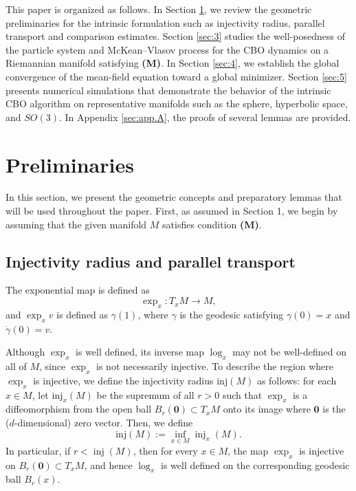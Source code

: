 \documentclass[11pt]{amsart}
\begin{document}
 
 

This paper is organized as follows. In Section \ref{sec:2}, we review the geometric preliminaries for the intrinsic formulation such as injectivity radius, parallel transport and comparison estimates. Section \ref{sec:3} studies the well-posedness of the particle system and McKean--Vlasov process for the CBO dynamics on a Riemannian manifold satisfying \textbf{(M)}. In Section \ref{sec:4}, we establish the global convergence of the mean-field equation toward a global minimizer. Section \ref{sec:5} presents numerical simulations that demonstrate the behavior of the intrinsic CBO algorithm on representative manifolds such as the sphere, hyperbolic space, and $SO(3)$. In Appendix \ref{sec:app.A}, the proofs of several lemmas are provided. 






\section{Preliminaries}\label{sec:2}
\setcounter{equation}{0}
In this section, we present the geometric concepts and preparatory lemmas that will be used throughout the paper. First, as assumed in Section 1, we begin by assuming that the given manifold $M$ satisfies condition \textbf{(M)}.

\subsection{Injectivity radius and parallel transport}\label{sec:2.1}
The exponential map is defined as  
\[
\exp_x:T_xM\to M,
\]
and $\exp_x v$ is defined as $\gamma(1)$, where $\gamma$ is the geodesic satisfying $\gamma(0)=x$ and $\dot{\gamma}(0)=v$.

Although $\exp_x$ is well defined, its inverse map $\log_x$ may not be well-defined on all of $M$, since $\exp_x$ is not necessarily injective. To describe the region where $\exp_x$ is injective, we define the injectivity radius $\mathrm{inj}(M)$ as follows: for each $x\in M$, let $\mathrm{inj}_x(M)$ be the supremum of all $r>0$ such that $\exp_x$ is a diffeomorphism from the open ball $B_r(\mathbf{0})\subset T_xM$ onto its image where $\mathbf{0}$ is the ($d$-dimensional) zero vector. Then, we define
\[
\mathrm{inj}(M):=\inf_{x\in M}\operatorname{inj}_x(M).
\]
In particular, if $r<\operatorname{inj}(M)$, then for every $x\in M$, the map $\exp_x$ is injective on $B_r(\mathbf{0})\subset T_xM$, and hence $\log_x$ is well defined on the corresponding geodesic ball $B_r(x)$. 
\end{document}
